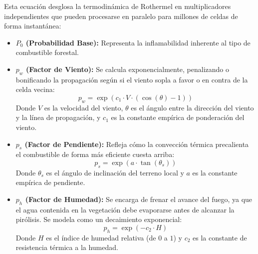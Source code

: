         Esta ecuación desglosa la termodinámica de Rothermel en multiplicadores independientes que pueden procesarse en paralelo para millones de celdas de forma instantánea:
        \begin{itemize}
            \item \textbf{$P_0$ (Probabilidad Base):} Representa la inflamabilidad inherente al tipo de combustible forestal.
            \item \textbf{$p_w$ (Factor de Viento):} Se calcula exponencialmente, penalizando o bonificando la propagación según si el viento sopla a favor o en contra de la celda vecina:
            $$p_w = \exp(c_1 \cdot V \cdot (\cos(\theta) - 1))$$
            Donde $V$ es la velocidad del viento, $\theta$ es el ángulo entre la dirección del viento y la línea de propagación, y $c_1$ es la constante empírica de ponderación del viento.
            \item \textbf{$p_s$ (Factor de Pendiente):} Refleja cómo la convección térmica precalienta el combustible de forma más eficiente cuesta arriba:
            $$p_s = \exp(a \cdot \tan(\theta_s))$$
            Donde $\theta_s$ es el ángulo de inclinación del terreno local y $a$ es la constante empírica de pendiente.
            \item \textbf{$p_h$ (Factor de Humedad):} Se encarga de frenar el avance del fuego, ya que el agua contenida en la vegetación debe evaporarse antes de alcanzar la pirólisis. Se modela como un decaimiento exponencial:
            $$p_h = \exp(- c_2 \cdot H)$$
            Donde $H$ es el índice de humedad relativa (de $0$ a $1$) y $c_2$ es la constante de resistencia térmica a la humedad.\\

        \end{itemize}
        
        \begin{table}[H]
            \centering
            \footnotesize
            \renewcommand{\arraystretch}{1.5}
            \caption[Valores empíricos para el Autómata Celular]{Valores empíricos de calibración para el Autómata Celular basados en el incendio de Spetses.}
            \label{tab:parametros_alexandridis}
        \end{table}

